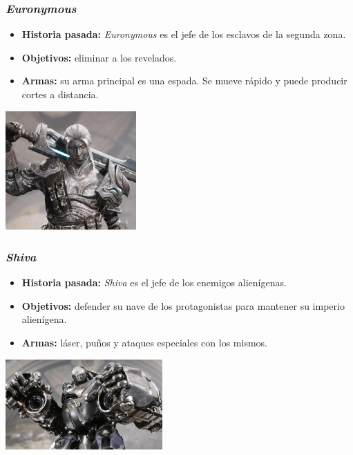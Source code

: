 \documentclass[11pt, twoside]{article}
\begin{document}
\subsubsection{\textit{Euronymous}}
\begin{itemize}
\item \textbf{Historia pasada:} \textit{Euronymous} es el jefe de los esclavos de la segunda zona.
\item \textbf{Objetivos:} eliminar a los revelados.
\item \textbf{Armas:} su arma principal es una espada. Se mueve rápido y puede producir cortes a distancia. 
\end{itemize}

\begin{center}
\includegraphics[width=5cm]{./images/euronymous.jpg}
\end{center}

\subsubsection{\textit{Shiva}}
\begin{itemize}
\item \textbf{Historia pasada:} \textit{Shiva} es el jefe de los enemigos alienígenas.
\item \textbf{Objetivos:} defender su nave de los protagonistas para mantener su imperio alienígena.
\item \textbf{Armas:} láser, puños y ataques especiales con los mismos. 
\end{itemize}

\begin{center}
\includegraphics[width=6cm]{./images/shiva.jpg}
\end{center}
\end{document}
